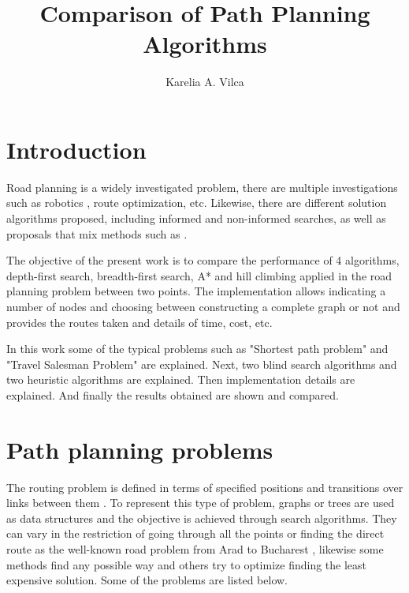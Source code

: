 \documentclass[12pt]{article}
\title{Comparison of Path Planning Algorithms\\ }
\author{Karelia A. Vilca\inst{1}}
\begin{document}
 


\maketitle

\begin{abstract}

\end{abstract}

\section{Introduction}
Road planning is a widely investigated problem, there are multiple investigations such as robotics \cite{shwail2013probabilistic}, route optimization, etc. Likewise, there are different solution algorithms proposed, including informed and non-informed searches, as well as proposals that mix methods such as \cite{felner2003kbfs}.

The objective of the present work is to compare the performance of 4 algorithms, depth-first search, breadth-first search, A* and hill climbing applied in the road planning problem between two points. The implementation allows indicating a number of nodes and choosing between constructing a complete graph or not and provides the routes taken and details of time, cost, etc.

In this work some of the typical problems such as "Shortest path problem" and "Travel Salesman Problem" are explained. Next, two blind search algorithms and two heuristic algorithms are explained. Then implementation details are explained. And finally the results obtained are shown and compared.



\section{Path planning problems}
The routing problem is defined in terms of specified positions and transitions over links between them \cite{russell2004inteligencia}. 
To represent this type of problem, graphs or trees are used as data structures and the objective is achieved through search algorithms.
They can vary in the restriction of going through all the points or finding the direct route as the well-known road problem from Arad to Bucharest \cite{russell2004inteligencia}, likewise some methods find any possible way and others try to optimize finding the least expensive solution. Some of the problems are listed below.
\end{document}
